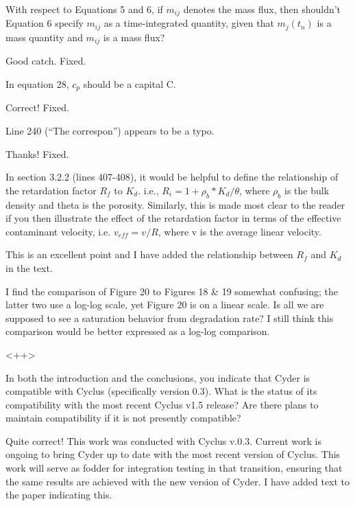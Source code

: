 \documentclass[answers,12pt]{exam}
\begin{document}
\begin{questions}
\question With respect to Equations 5 and 6, if $m_{ij}$ denotes the mass flux, 
then shouldn't Equation 6 specify $m_{ij}$ as a time-integrated quantity, given 
that $m_j(t_n)$ is a mass quantity and $m_{ij}$ is a mass flux?
\begin{solution}
        Good catch. Fixed.
\end{solution}

\question In equation 28, $c_p$ should be a capital C.
\begin{solution}
Correct! Fixed.
\end{solution}

\question Line 240 (``The correspon'') appears to be a typo.
\begin{solution}
Thanks! Fixed.
\end{solution}

\question In section 3.2.2 (lines 407-408), it would be helpful to define the relationship of the retardation factor $R_f$ to $K_d$. i.e., $R_i = 1 + \rho_b 
* K_d / \theta$, where $\rho_b$ is the bulk density and theta is the porosity.  Similarly, this is made most clear to the reader if you then illustrate the effect of the retardation factor in terms of the effective contaminant velocity, i.e. $v_{eff} = v/R$, where v is the average linear velocity.
\begin{solution}
        This is an excellent point and I have added the relationship between 
        $R_f$ and $K_d$ in the text. 
\end{solution}

\question I find the comparison of Figure 20 to Figures 18 \& 19 somewhat confusing; the latter two use a log-log scale, yet Figure 20 is on a linear scale. Is all we are supposed to see a saturation behavior from degradation rate? I still think this comparison would be better expressed as a log-log comparison.
\begin{solution}
<++>
\end{solution}

\question In both the introduction and the conclusions, you indicate that Cyder is compatible with Cyclus (specifically version 0.3). What is the status of its compatibility with the most recent Cyclus v1.5 release? Are there plans to maintain compatibility if it is not presently compatible?
\begin{solution}
Quite correct! This work was conducted with Cyclus v.0.3. Current work is ongoing to 
bring Cyder up to date with the most recent version of Cyclus. This work will 
serve as fodder for integration testing in that transition, ensuring that the 
same results are achieved with the new version of Cyder. I have added text to 
the paper indicating this.
\end{solution}


\end{questions}
\end{document}
